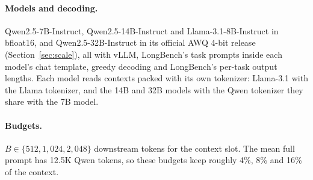 \documentclass[11pt]{article}
\begin{document}
\paragraph{Models and decoding.} Qwen2.5-7B-Instruct, Qwen2.5-14B-Instruct \citep{qwen2025qwen25} and Llama-3.1-8B-Instruct \citep{grattafiori2024llama3} in bfloat16, and Qwen2.5-32B-Instruct in its official AWQ 4-bit release (Section~\ref{sec:scale}), all with vLLM, LongBench's task prompts inside each model's chat template, greedy decoding and LongBench's per-task output lengths. Each model reads contexts packed with its own tokenizer: Llama-3.1 with the Llama tokenizer, and the 14B and 32B models with the Qwen tokenizer they share with the 7B model.

\paragraph{Budgets.} $B\in\{512, 1{,}024, 2{,}048\}$ downstream tokens for the context slot. The mean full prompt has 12.5K Qwen tokens, so these budgets keep roughly 4\%, 8\% and 16\% of the context.
\end{document}
